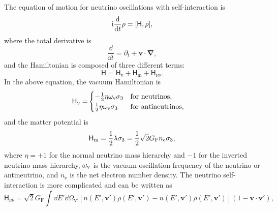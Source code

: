The equation of motion for neutrino oscillations with self-interaction is~\cite{Sigl1993}
\begin{equation}
   \ri \frac{\dd}{\dd t}\rho = [ \mathsf H,\rho],
   \label{chap:collective-sec:collective-eqn:equation-of-motion-general}
\end{equation}
where the total derivative is
\begin{equation}
   \frac{\dd}{\dd t} = \partial_t + \mathbf v\cdot \boldsymbol{\nabla},
\end{equation}
and the Hamiltonian is composed of three different terms:
\begin{equation}
   \mathsf H = \mathsf H_{\mathrm v} + \mathsf H_{\mathrm m} +\mathsf  H_{\nu\nu}.
\end{equation}
In the above equation, the vacuum Hamiltonian is
\begin{align*}
    \mathsf H_\mathrm v =& \begin{cases}
    -\frac{1}{2}\eta \omega_\mathrm v \sigma_3 & \text{for neutrinos},\\
    \frac{1}{2}\eta \omega_\mathrm v \sigma_3 & \text{for antineutrinos},
    \end{cases}
\end{align*}
and the matter potential is
\begin{equation}
    \mathsf H_\mathrm m = \frac{1}{2} \lambda \sigma_3  = \frac{1}{2} \sqrt{2}G_{\mathrm F} n_{\mathrm e} \sigma_3,
\end{equation}
where $\eta = +1$ for the normal neutrino mass hierarchy and $-1$ for the inverted neutrino mass hierarchy, $\omega_\mathrm v$ is the vacuum oscillation frequency of the neutrino or antineutrino, and $n_{\mathrm e}$ is the net electron number density. The neutrino self-interaction is more complicated and can be written as
\begin{equation}
    \mathsf H_{\nu\nu} = \sqrt{2}G_{\mathrm F} \int \dd E' \dd\Omega_{\mathbf v'} \left[ n(E',\mathbf v')\rho(E',\mathbf v') - \bar n(E',\mathbf v')\bar\rho(E',\mathbf v') \right] (1-\mathbf v \cdot \mathbf v'),
    \label{chap:collective-sec:collective-eqn:equation-of-motion-self-interaction}
\end{equation}

